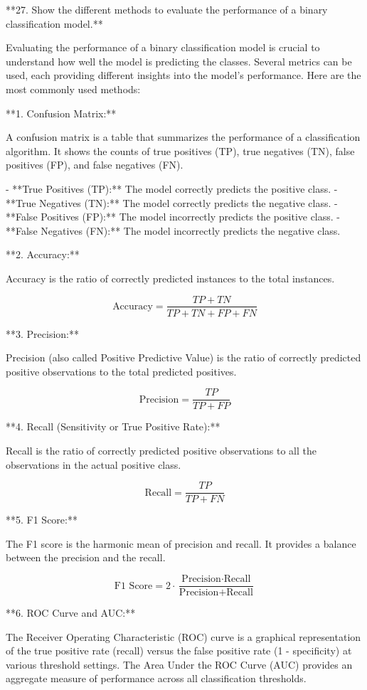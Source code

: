  **27. Show the different methods to evaluate the performance of a binary classification model.**

Evaluating the performance of a binary classification model is crucial to understand how well the model is predicting the classes. Several metrics can be used, each providing different insights into the model's performance. Here are the most commonly used methods:

**1. Confusion Matrix:**

A confusion matrix is a table that summarizes the performance of a classification algorithm. It shows the counts of true positives (TP), true negatives (TN), false positives (FP), and false negatives (FN).

- **True Positives (TP):** The model correctly predicts the positive class.
- **True Negatives (TN):** The model correctly predicts the negative class.
- **False Positives (FP):** The model incorrectly predicts the positive class.
- **False Negatives (FN):** The model incorrectly predicts the negative class.

**2. Accuracy:**

Accuracy is the ratio of correctly predicted instances to the total instances.

\[ \text{Accuracy} = \frac{TP + TN}{TP + TN + FP + FN} \]

**3. Precision:**

Precision (also called Positive Predictive Value) is the ratio of correctly predicted positive observations to the total predicted positives.

\[ \text{Precision} = \frac{TP}{TP + FP} \]

**4. Recall (Sensitivity or True Positive Rate):**

Recall is the ratio of correctly predicted positive observations to all the observations in the actual positive class.

\[ \text{Recall} = \frac{TP}{TP + FN} \]

**5. F1 Score:**

The F1 score is the harmonic mean of precision and recall. It provides a balance between the precision and the recall.

\[ \text{F1 Score} = 2 \cdot \frac{\text{Precision} \cdot \text{Recall}}{\text{Precision} + \text{Recall}} \]

**6. ROC Curve and AUC:**

The Receiver Operating Characteristic (ROC) curve is a graphical representation of the true positive rate (recall) versus the false positive rate (1 - specificity) at various threshold settings. The Area Under the ROC Curve (AUC) provides an aggregate measure of performance across all classification thresholds.

